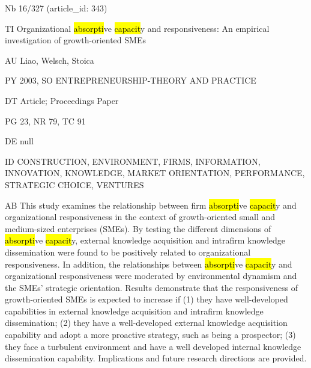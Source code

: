 \documentclass[a4paper]{article}
\begin{document}
\vspace*{-2cm}
Nb \tabto{0cm}16/327 (article\_id: 343)\par
TI \tabto{0cm}Organizational \hl{absorpti}ve \hl{capacit}y and responsiveness: An empirical investigation of growth-oriented SMEs\par
AU \tabto{0cm}Liao, Welsch, Stoica\par
PY \tabto{0cm}2003, SO ENTREPRENEURSHIP-THEORY AND PRACTICE\par
DT \tabto{0cm}Article; Proceedings Paper\par
PG \tabto{0cm}23, NR 79, TC 91\par
DE \tabto{0cm}null\par
ID \tabto{0cm}CONSTRUCTION, ENVIRONMENT, FIRMS, INFORMATION, INNOVATION, KNOWLEDGE, MARKET ORIENTATION, PERFORMANCE, STRATEGIC CHOICE, VENTURES\par
AB \tabto{0cm}This study examines the relationship between firm \hl{absorpti}ve \hl{capacit}y and organizational responsiveness in the context of growth-oriented small and medium-sized enterprises (SMEs). By testing the different dimensions of \hl{absorpti}ve \hl{capacit}y, external knowledge acquisition and intrafirm knowledge dissemination were found to be positively related to organizational responsiveness. In addition, the relationships between \hl{absorpti}ve \hl{capacit}y and organizational responsiveness were moderated by environmental dynamism and the SMEs' strategic orientation. Results demonstrate that the responsiveness of growth-oriented SMEs is expected to increase if (1) they have well-developed capabilities in external knowledge acquisition and intrafirm knowledge dissemination; (2) they have a well-developed external knowledge acquisition capability and adopt a more proactive strategy, such as being a prospector; (3) they face a turbulent environment and have a well developed internal knowledge dissemination capability. Implications and future research directions are provided.\par
\clearpage
\end{document}
